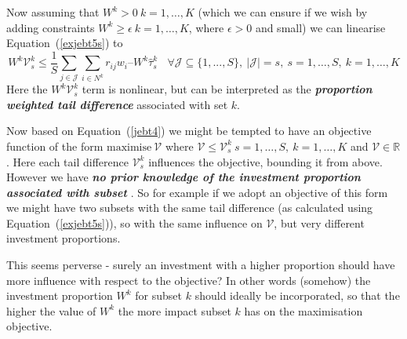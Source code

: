 Now assuming that $W^k > 0~k=1,\ldots,K$ (which we can ensure if we wish by adding constraints $W^k \geq \epsilon~k=1,\ldots,K$, where $\epsilon{>}0$ and small) we can linearise Equation~(\ref{exjebt5s}) to 
\begin{equation}
W^k \mathcal{V}_s^k \leq \frac{1}{S} \sum_{j \in \mathcal{J}} \sum_{i \in N^k} r_{ij} w_i – W^k \hat{\tau}_s^k~~~~\forall \mathcal{J} \subseteq \{1, ..., S\},~|\mathcal{J}| = s,~s=1,\ldots,S,~k=1,\ldots,K
\label{exjebt5slin}
\end{equation}
Here the $ W^k \mathcal{V}_s^k$  term is nonlinear, but can be interpreted as the \emph{\textbf{proportion weighted tail difference}} associated with set $k$. 

Now based on Equation~(\ref{jebt4}) we might be tempted to have an objective function of the form 
$\mbox{maximise}~\mathcal{V}$ where  $\mathcal{V} \leq \mathcal{V}_s^k~s{=}1,\ldots,S,~k{=}1,\ldots,K$
and $\mathcal{V} \in\mathbb{R}$.
Here each  tail difference $\mathcal{V}_s^k$ influences the objective, bounding it from above. However we have 
\emph{\textbf{no prior knowledge of the investment proportion associated with subset }}. 
So for example if we adopt an objective of this form 
we might have two subsets with the same tail difference (as calculated using Equation~(\ref{exjebt5s})), so with the same influence on $\mathcal{V}$,
 but very different investment proportions.

This seems perverse - surely an investment with a higher proportion should have more influence with respect to the
 objective? In other words (somehow) the investment proportion $W^k$ for subset $k$ should ideally be incorporated, 
so that the higher the value of $W^k$ the more impact subset $k$ has on the maximisation objective.

